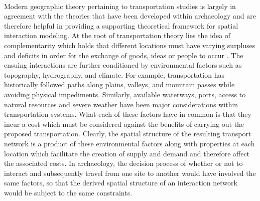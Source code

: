 \documentclass[12pt,a4paper]{thesis}
\begin{document}
\paragraph{}
Modern geographic theory pertaining to transportation studies is largely in agreement with the theories that have been developed within archaeology and are therefore helpful in providing a supporting theoretical framework for spatial interaction modeling. At the root of transportation theory lies the idea of complementarity which holds that different locations must have varying surpluses and deficits in order for the exchange of goods, ideas or people to occur \citep{RodComSla06}. The ensuing interactions are further conditioned by environmental factors such as topography, hydrography, and climate. For example, transportation has historically followed paths along plains, valleys, and mountain passes while avoiding physical impediments. Similarly, available waterways, ports, access to natural resources and severe weather have been major considerations within transportation systems. What each of these factors have in common is that they incur a cost which must be considered against the benefits of carrying out the proposed transportation. Clearly, the spatial structure of the resulting transport network is a product of these environmental factors along with properties at each location which facilitate the creation of supply and demand and therefore affect the associated costs. In archaeology, the decision process of whether or not to interact and subsequently travel from one site to another would have involved the same factors, so that the derived spatial structure of an interaction network would be subject to the same constraints.    

\paragraph{}
	
\end{document}
